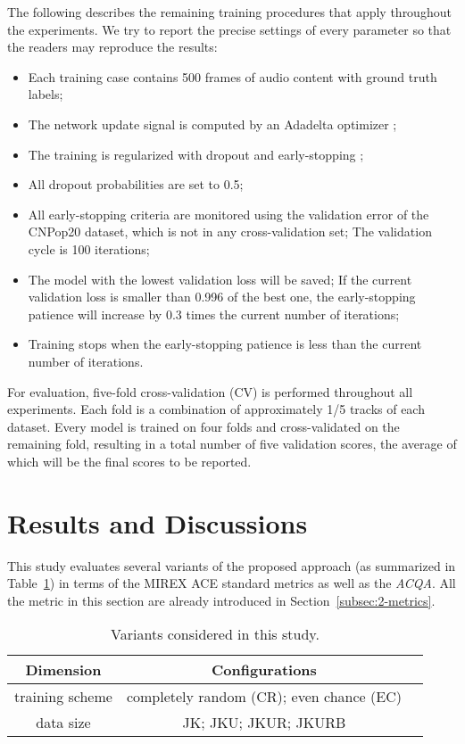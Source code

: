 The following describes the remaining training procedures that apply throughout the experiments. We try to report the precise settings of every parameter so that the readers may reproduce the results:
\begin{itemize}
	\item Each training case contains 500 frames of audio content with ground truth labels;
	\item The network update signal is computed by an Adadelta optimizer \cite{zeiler2012adadelta};
	\item The training is regularized with dropout \cite{srivastava2014dropout} and early-stopping \cite{prechelt1998early};
	\item All dropout probabilities are set to 0.5;
	\item All early-stopping criteria are monitored using the validation error of the CNPop20 dataset, which is not in any cross-validation set; The validation cycle is 100 iterations;
	\item The model with the lowest validation loss will be saved; If the current validation loss is smaller than 0.996 of the best one, the early-stopping patience will increase by 0.3 times the current number of iterations;
	\item Training stops when the early-stopping patience is less than the current number of iterations.
\end{itemize}
For evaluation, five-fold cross-validation (CV) is performed throughout all experiments. Each fold is a combination of approximately 1/5 tracks of each dataset. Every model is trained on four folds and cross-validated on the remaining fold, resulting in a total number of five validation scores, the average of which will be the final scores to be reported.

\section{Results and Discussions} \label{sec:4-res}
This study evaluates several variants of the proposed approach (as summarized in Table~\ref{tab:4-varexplore}) in terms of the MIREX ACE standard metrics as well as the \textit{ACQA}. All the metric in this section are already introduced in Section~\ref{subsec:2-metrics}.
\begin{table}[htb]
	\centering
	\scriptsize
	\begin{tabular}{|c|c|c|} \hline
		Dimension & Configurations \\ \hline
		training scheme & completely random (CR); even chance (EC) \\ \hline
		data size & JK; JKU; JKUR; JKURB \\ \hline
	\end{tabular}
	\caption{Variants considered in this study.}
	\label{tab:4-varexplore}
\end{table}


